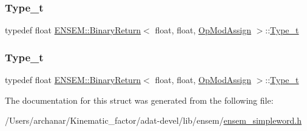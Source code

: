 \mbox{\label{structENSEM_1_1BinaryReturn_3_01float_00_01float_00_01OpModAssign_01_4_ae702556f8b6bcd0be5c8369133fc5c95}} 
\subsubsection{\texorpdfstring{Type\_t}{Type\_t}\hspace{0.1cm}{\footnotesize\ttfamily [2/3]}}
{\footnotesize\ttfamily typedef float \mbox{\hyperlink{structENSEM_1_1BinaryReturn}{E\+N\+S\+E\+M\+::\+Binary\+Return}}$<$ float, float, \mbox{\hyperlink{structENSEM_1_1OpModAssign}{Op\+Mod\+Assign}} $>$\+::\mbox{\hyperlink{structENSEM_1_1BinaryReturn_3_01float_00_01float_00_01OpModAssign_01_4_ae702556f8b6bcd0be5c8369133fc5c95}{Type\+\_\+t}}}

\mbox{\label{structENSEM_1_1BinaryReturn_3_01float_00_01float_00_01OpModAssign_01_4_ae702556f8b6bcd0be5c8369133fc5c95}} 
\subsubsection{\texorpdfstring{Type\_t}{Type\_t}\hspace{0.1cm}{\footnotesize\ttfamily [3/3]}}
{\footnotesize\ttfamily typedef float \mbox{\hyperlink{structENSEM_1_1BinaryReturn}{E\+N\+S\+E\+M\+::\+Binary\+Return}}$<$ float, float, \mbox{\hyperlink{structENSEM_1_1OpModAssign}{Op\+Mod\+Assign}} $>$\+::\mbox{\hyperlink{structENSEM_1_1BinaryReturn_3_01float_00_01float_00_01OpModAssign_01_4_ae702556f8b6bcd0be5c8369133fc5c95}{Type\+\_\+t}}}



The documentation for this struct was generated from the following file\+:\begin{DoxyCompactItemize}
\item 
/\+Users/archanar/\+Kinematic\+\_\+factor/adat-\/devel/lib/ensem/\mbox{\hyperlink{adat-devel_2lib_2ensem_2ensem__simpleword_8h}{ensem\+\_\+simpleword.\+h}}\end{DoxyCompactItemize}
